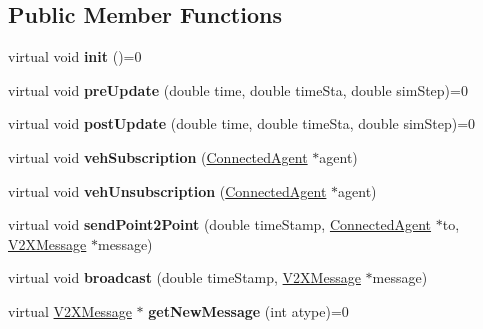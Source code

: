 \subsection*{Public Member Functions}
\begin{DoxyCompactItemize}
\item 
virtual void {\bfseries init} ()=0\hypertarget{classV2XBroker_a4b48721b0ca1e99d2d39c657564a629c}{}\label{classV2XBroker_a4b48721b0ca1e99d2d39c657564a629c}

\item 
virtual void {\bfseries pre\+Update} (double time, double time\+Sta, double sim\+Step)=0\hypertarget{classV2XBroker_a6236c2c50501e4489768e0f761acb6be}{}\label{classV2XBroker_a6236c2c50501e4489768e0f761acb6be}

\item 
virtual void {\bfseries post\+Update} (double time, double time\+Sta, double sim\+Step)=0\hypertarget{classV2XBroker_a1942364f64b119c38004a1c80136c533}{}\label{classV2XBroker_a1942364f64b119c38004a1c80136c533}

\item 
virtual void {\bfseries veh\+Subscription} (\hyperlink{classConnectedAgent}{Connected\+Agent} $\ast$agent)\hypertarget{classV2XBroker_a0239382f19ef6e03c7ef72968375cf98}{}\label{classV2XBroker_a0239382f19ef6e03c7ef72968375cf98}

\item 
virtual void {\bfseries veh\+Unsubscription} (\hyperlink{classConnectedAgent}{Connected\+Agent} $\ast$agent)\hypertarget{classV2XBroker_a4ea13cca6619f4ffd3acd9e497b2bdd5}{}\label{classV2XBroker_a4ea13cca6619f4ffd3acd9e497b2bdd5}

\item 
virtual void {\bfseries send\+Point2\+Point} (double time\+Stamp, \hyperlink{classConnectedAgent}{Connected\+Agent} $\ast$to, \hyperlink{classV2XMessage}{V2\+X\+Message} $\ast$message)\hypertarget{classV2XBroker_a8ce71187ab605a8c2474c3846d831e91}{}\label{classV2XBroker_a8ce71187ab605a8c2474c3846d831e91}

\item 
virtual void {\bfseries broadcast} (double time\+Stamp, \hyperlink{classV2XMessage}{V2\+X\+Message} $\ast$message)\hypertarget{classV2XBroker_a63e70972e73690d8feea7e42f96b27a4}{}\label{classV2XBroker_a63e70972e73690d8feea7e42f96b27a4}

\item 
virtual \hyperlink{classV2XMessage}{V2\+X\+Message} $\ast$ {\bfseries get\+New\+Message} (int atype)=0\hypertarget{classV2XBroker_a41b696d9f9a515b77f16abe3bb2134f6}{}\label{classV2XBroker_a41b696d9f9a515b77f16abe3bb2134f6}

\end{DoxyCompactItemize}
